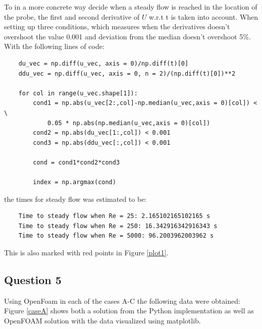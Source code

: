 \documentclass[10pt]{report}
\begin{document}
To in a more concrete way decide when a steady flow is reached in the location of the probe, the first and second derivative
of $U$ w.r.t t is taken into account. When setting up three conditions, which measures when the derivatives
doesn't overshoot the value 0.001 and deviation from the median doesn't overshoot 5\%. With the following lines of code:
\begin{lstlisting}
    du_vec = np.diff(u_vec, axis = 0)/np.diff(t)[0]
    ddu_vec = np.diff(u_vec, axis = 0, n = 2)/(np.diff(t)[0])**2

    for col in range(u_vec.shape[1]):
        cond1 = np.abs(u_vec[2:,col]-np.median(u_vec,axis = 0)[col]) < \
            0.05 * np.abs(np.median(u_vec,axis = 0)[col])
        cond2 = np.abs(du_vec[1:,col]) < 0.001
        cond3 = np.abs(ddu_vec[:,col]) < 0.001

        cond = cond1*cond2*cond3

        index = np.argmax(cond)
\end{lstlisting}
the times for steady flow was estimated to be:
\begin{lstlisting}
    Time to steady flow when Re = 25: 2.165102165102165 s
    Time to steady flow when Re = 250: 16.342916342916343 s
    Time to steady flow when Re = 5000: 96.2003962003962 s
\end{lstlisting}
This is also marked with red points in Figure \ref{plot1}.
\subsection*{Question 5}
Using OpenFoam in each of the cases A-C the following data were obtained: Figure \ref{caseA} shows
both a solution from the Python implementation as well as OpenFOAM solution with the data visualized using matplotlib.
\end{document}
